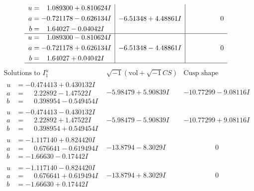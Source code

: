 \documentclass[1p]{elsarticle_modified}
\theoremstyle{definition}
\newcommand{\I}{\sqrt{-1}}
\begin{document}
$$\begin{array}{c|c|c}
\begin{aligned}
u &= \phantom{-}1.089300 + 0.810624 I \\
a &= -0.721178 - 0.626134 I \\
b &= \phantom{-}1.64027 - 0.04042 I\end{aligned}
 & -6.51348 + 4.48861 I & \phantom{-0.000000 } 0 \\ \hline\begin{aligned}
u &= \phantom{-}1.089300 - 0.810624 I \\
a &= -0.721178 + 0.626134 I \\
b &= \phantom{-}1.64027 + 0.04042 I\end{aligned}
 & -6.51348 - 4.48861 I & \phantom{-0.000000 } 0\\
 \hline 
 \end{array}$$\newpage$$\begin{array}{c|c|c}  
\text{Solutions to }I^u_{1}& \I (\text{vol} + \sqrt{-1}CS) & \text{Cusp shape}\\
 \hline 
\begin{aligned}
u &= -0.474413 + 0.430132 I \\
a &= \phantom{-}2.22892 - 1.47522 I \\
b &= \phantom{-}0.398954 - 0.549454 I\end{aligned}
 & -5.98479 + 5.90839 I & -10.77299 - 9.08116 I \\ \hline\begin{aligned}
u &= -0.474413 - 0.430132 I \\
a &= \phantom{-}2.22892 + 1.47522 I \\
b &= \phantom{-}0.398954 + 0.549454 I\end{aligned}
 & -5.98479 - 5.90839 I & -10.77299 + 9.08116 I \\ \hline\begin{aligned}
u &= -1.117140 + 0.824420 I \\
a &= \phantom{-}0.676641 - 0.619494 I \\
b &= -1.66630 - 0.17442 I\end{aligned}
 & -13.8794 - 8.3029 I & \phantom{-0.000000 } 0 \\ \hline\begin{aligned}
u &= -1.117140 - 0.824420 I \\
a &= \phantom{-}0.676641 + 0.619494 I \\
b &= -1.66630 + 0.17442 I\end{aligned}
 & -13.8794 + 8.3029 I & \phantom{-0.000000 } 0 \\ \hline\begin{aligned}

\end{aligned}
\end{array}$$
\end{document}
